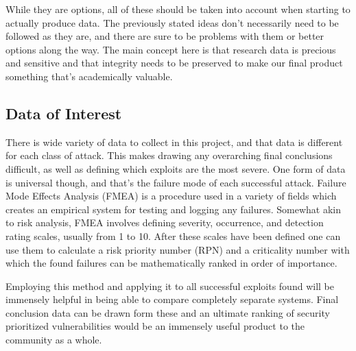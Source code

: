 \documentclass[IEEEtran,letterpaper,10pt,titlepage,draftclsnofoot,onecolumn]{article}
\begin{document}
While they are options, all of these should be taken into account when starting to actually produce data. 
The previously stated ideas don't necessarily need to be followed as they are, and there are sure to be problems with them or better options along the way.
The main concept here is that research data is precious and sensitive and that integrity needs to be preserved to make our final product something that's academically valuable.

\subsection*{Data of Interest}
There is wide variety of data to collect in this project, and that data is different for each class of attack.
This makes drawing any overarching final conclusions difficult, as well as defining which exploits are the most severe.
One form of data is universal though, and that's the failure mode of each successful attack.
Failure Mode Effects Analysis (FMEA) is a procedure used in a variety of fields which creates an empirical system for testing and logging any failures.
Somewhat akin to risk analysis, FMEA involves defining severity, occurrence, and detection rating scales, usually from 1 to 10.
After these scales have been defined one can use them to calculate a risk priority number (RPN) and a criticality number with which the found failures can be mathematically ranked in order of importance. \cite{FMEA}

Employing this method and applying it to all successful exploits found will be immensely helpful in being able to compare completely separate systems.
Final conclusion data can be drawn form these and an ultimate ranking of security prioritized vulnerabilities would be an immensely useful product to the community as a whole.



\end{document}

